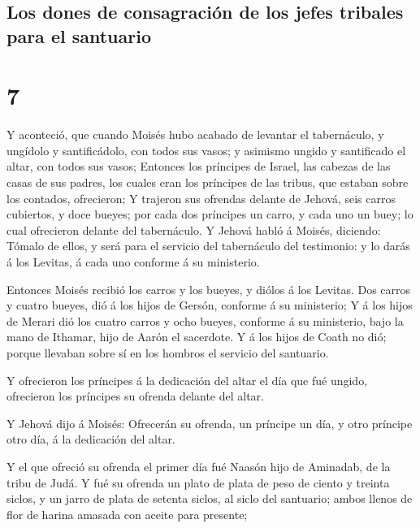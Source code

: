 \hypertarget{los-dones-de-consagraciuxf3n-de-los-jefes-tribales-para-el-santuario}{%
\subsection{Los dones de consagración de los jefes tribales para el
santuario}\label{los-dones-de-consagraciuxf3n-de-los-jefes-tribales-para-el-santuario}}

\hypertarget{section-6}{%
\section{7}\label{section-6}}

 Y aconteció, que cuando Moisés hubo acabado de levantar
el tabernáculo, y ungídolo y santificádolo, con todos sus vasos; y
asimismo ungido y santificado el altar, con todos sus vasos;
 Entonces los príncipes de Israel, las cabezas de las
casas de sus padres, los cuales eran los príncipes de las tribus, que
estaban sobre los contados, ofrecieron;  Y trajeron sus
ofrendas delante de Jehová, seis carros cubiertos, y doce bueyes; por
cada dos príncipes un carro, y cada uno un buey; lo cual ofrecieron
delante del tabernáculo.  Y Jehová habló á Moisés,
diciendo:  Tómalo de ellos, y será para el servicio del
tabernáculo del testimonio: y lo darás á los Levitas, á cada uno
conforme á su ministerio.

 Entonces Moisés recibió los carros y los bueyes, y diólos
á los Levitas.  Dos carros y cuatro bueyes, dió á los
hijos de Gersón, conforme á su ministerio;  Y á los hijos
de Merari dió los cuatro carros y ocho bueyes, conforme á su ministerio,
bajo la mano de Ithamar, hijo de Aarón el sacerdote.  Y á
los hijos de Coath no dió; porque llevaban sobre sí en los hombros el
servicio del santuario.

 Y ofrecieron los príncipes á la dedicación del altar el
día que fué ungido, ofrecieron los príncipes su ofrenda delante del
altar.

 Y Jehová dijo á Moisés: Ofrecerán su ofrenda, un
príncipe un día, y otro príncipe otro día, á la dedicación del altar.

 Y el que ofreció su ofrenda el primer día fué Naasón
hijo de Aminadab, de la tribu de Judá.  Y fué su ofrenda
un plato de plata de peso de ciento y treinta siclos, y un jarro de
plata de setenta siclos, al siclo del santuario; ambos llenos de flor de
harina amasada con aceite para presente;

